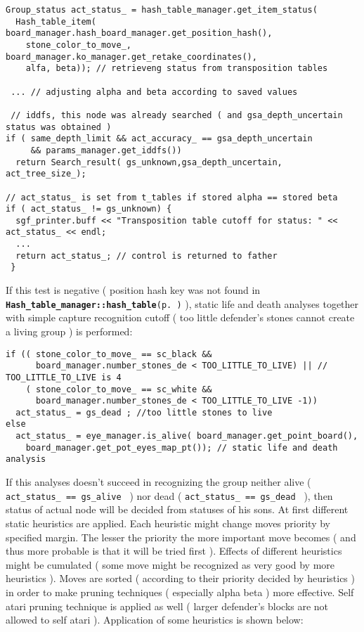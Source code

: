 \footnotesize\begin{verbatim}Group_status act_status_ = hash_table_manager.get_item_status( 
  Hash_table_item( board_manager.hash_board_manager.get_position_hash(),
    stone_color_to_move_, board_manager.ko_manager.get_retake_coordinates(),
    alfa, beta)); // retrieveng status from transposition tables 
        
 ... // adjusting alpha and beta according to saved values                                                                  
  
 // iddfs, this node was already searched ( and gsa_depth_uncertain status was obtained ) 
if ( same_depth_limit && act_accuracy_ == gsa_depth_uncertain 
     && params_manager.get_iddfs())
  return Search_result( gs_unknown,gsa_depth_uncertain, act_tree_size_); 

// act_status_ is set from t_tables if stored alpha == stored beta  
if ( act_status_ != gs_unknown) { 
  sgf_printer.buff << "Transposition table cutoff for status: " << act_status_ << endl;
  ...
  return act_status_; // control is returned to father
 }
\end{verbatim}
\normalsize


If this test is negative ( position hash key was not found in {\tt {\bf Hash\_\-table\_\-manager::hash\_\-table}{\rm (p.\,\pageref{classHash__table__manager_r1})}} ), static life and death analyses together with simple capture recognition cutoff ( too little defender's stones cannot create a living group ) is performed: 

\footnotesize\begin{verbatim}if (( stone_color_to_move_ == sc_black && 
      board_manager.number_stones_de < TOO_LITTLE_TO_LIVE) || // TOO_LITTLE_TO_LIVE is 4
    ( stone_color_to_move_ == sc_white && 
      board_manager.number_stones_de < TOO_LITTLE_TO_LIVE -1)) 
  act_status_ = gs_dead ; //too little stones to live  
else 
  act_status_ = eye_manager.is_alive( board_manager.get_point_board(),
    board_manager.get_pot_eyes_map_pt()); // static life and death analysis
\end{verbatim}
\normalsize


If this analyses doesn't succeed in recognizing the group neither alive ( {\tt  act\_\-status\_\- == gs\_\-alive } ) nor dead ( {\tt  act\_\-status\_\- == gs\_\-dead } ), then status of actual node will be decided from statuses of his sons. At first different static heuristics are applied. Each heuristic might change moves priority by specified margin. The lesser the priority the more important move becomes ( and thus more probable is that it will be tried first ). Effects of different heuristics might be cumulated ( some move might be recognized as very good by more heuristics ). Moves are sorted ( according to their priority decided by heuristics ) in order to make pruning techniques ( especially alpha beta ) more effective. Self atari pruning technique is applied as well ( larger defender's blocks are not allowed to self atari ). Application of some heuristics is shown below:



